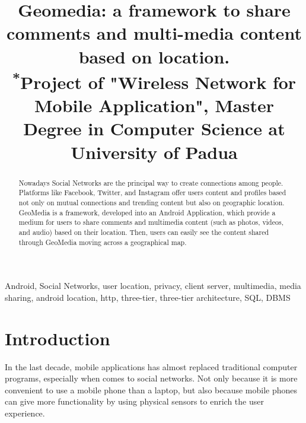\documentclass[conference]{IEEEtran}
\begin{document}
\title{Geomedia: a framework to share comments and multi-media content based on location.\\
{\footnotesize \textsuperscript{*}Project of "Wireless Network for Mobile Application", Master Degree in Computer Science at University of Padua}
}

\author{
\and
{}
}

\maketitle

\begin{abstract}
Nowadays Social Networks are the principal way to create connections among people.
Platforms like Facebook, Twitter, and Instagram offer users content and profiles based not only on mutual connections and trending content but also on geographic location.
\\
GeoMedia is a framework, developed into an Android Application, which provide a medium for users to share comments and multimedia content (such as photos, videos, and audio) based on their location.
Then, users can easily see the content shared through GeoMedia moving across a geographical map.
\end{abstract}

\begin{IEEEkeywords}
Android, Social Networks, user location, privacy, client server, multimedia, media sharing, android location, http, three-tier, three-tier architecture, SQL, DBMS
\end{IEEEkeywords}

\section{Introduction}
In the last decade, mobile applications has almost replaced traditional computer programs, especially when comes to social networks. Not only because it is more convenient to use a mobile phone than a laptop, but also because mobile phones can give more functionality by using physical sensors to enrich the user experience.
\end{document}
